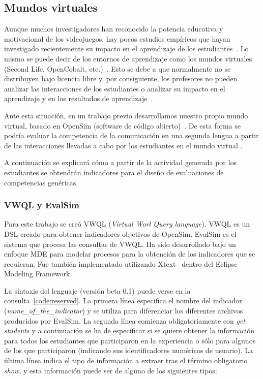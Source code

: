 \subsection{Mundos virtuales}

Aunque muchos investigadores han reconocido la potencia educativa y motivacional de los videojuegos, hay pocos estudios empíricos que hayan investigado recientemente su impacto en el aprendizaje de los estudiantes~\cite{berns2013game}. Lo mismo se puede decir de los entornos de aprendizaje como los mundos virtuales (Second Life, OpenCobalt, etc.)~\cite{hew2010use}. Esto se debe a que normalmente no se distribuyen bajo licencia libre y, por consiguiente, los profesores no pueden analizar las interacciones de los estudiantes o analizar su impacto en el aprendizaje y en los resultados de aprendizaje~\cite{cruz2015discovering,moreno2014serious}. 

Ante esta situación, en un trabajo previo desarrollamos nuestro propio mundo virtual, basado en OpenSim (software de código abierto)~\cite{berns2013using}. De esta forma se podría evaluar la competencia de la comunicación en una segunda lengua a partir de las interacciones llevadas a cabo por los estudiantes en el mundo virtual . 

A continuación se explicará cómo a partir de la actividad generada por los estudiantes se obtendrán indicadores para el diseño de evaluaciones de competencias genéricas.

\subsubsection{VWQL y EvalSim}

Para este trabajo se creó VWQL (\emph{Virtual Worl Query language}). VWQL es un DSL creado para obtener indicadores objetivos de OpenSim. EvalSim es el sistema que procesa las consultas de VWQL. Ha sido desarrollado bajo un enfoque MDE para modelar procesos para la obtención de los indicadores que se requieran. Fue también implementado utilizando Xtext~\cite{eysholdt2010xtext} dentro del Eclipse Modeling Framework.

La sintaxis del lenguaje (versión beta 0.1) puede verse en la consulta~\ref{code:reserved}. La primera línea especifica el nombre del indicador (\emph{name\_of\_the\_indicator}) y se utiliza para diferenciar los diferentes archivos producidos por EvalSim. La segunda línea comienza obligatoriamente con \emph{get students} y a continuación se ha de especificar si se quiere obtener la información para todos los estudiantes que participaron en la experiencia o sólo para algunos de los que participaron (indicando sus identificadores numéricos de usuario). La última línea indica el tipo de información a extraer tras el término obligatorio \emph{show}, y esta información puede ser de alguno de los siguientes tipos:

